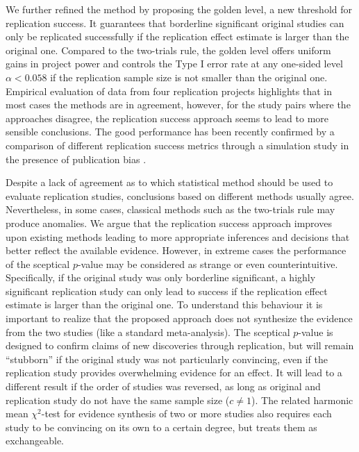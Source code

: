 We further refined the method by proposing the golden level, a new threshold for
replication success. It guarantees that borderline significant original studies
can only be replicated successfully if the replication effect estimate is larger
than the original one. Compared to the two-trials rule, the golden level offers
uniform gains in project power and controls the Type I error rate at any
one-sided level $\alpha < 0.058$ if the replication sample size
is not smaller than the original one. Empirical evaluation of data from four
replication projects highlights that in most cases the methods are in agreement,
however, for the study pairs where the approaches disagree, the replication
success approach seems to lead to more sensible conclusions. The good
performance has been recently confirmed by a comparison of different replication
success metrics through a simulation study in the presence of publication bias
\citep{Muradchanian2021}.

Despite a lack of agreement as to which statistical method should be used to
evaluate replication studies, conclusions based on different methods usually
agree. Nevertheless, in some cases, classical methods such as the two-trials
rule may produce anomalies. We argue that the replication success approach
improves upon existing methods leading to more appropriate inferences and
decisions that better reflect the available evidence. However, in extreme cases
the performance of the sceptical $p$-value may be considered as strange or even
counterintuitive. Specifically, if the original study was only borderline
significant, a highly significant replication study can only lead to success if
the replication effect estimate is larger than the original one. To understand
this behaviour it is important to realize that the proposed approach does not
synthesize the evidence from the two studies (like a standard meta-analysis).
The sceptical $p$-value is designed to confirm claims of new discoveries through
replication, but will remain ``stubborn'' \citep{Ly2020} if the original study
was not particularly convincing, even if the replication study provides
overwhelming evidence for an effect. It will lead to a different result if the
order of studies was reversed, as long as original and replication study do not
have the same sample size ($c \neq 1$). The related harmonic mean $\chi^2$-test
\citep{Held2020b} for evidence synthesis of two or more studies also requires
each study to be convincing on its own to a certain degree, but treats them as
exchangeable.

